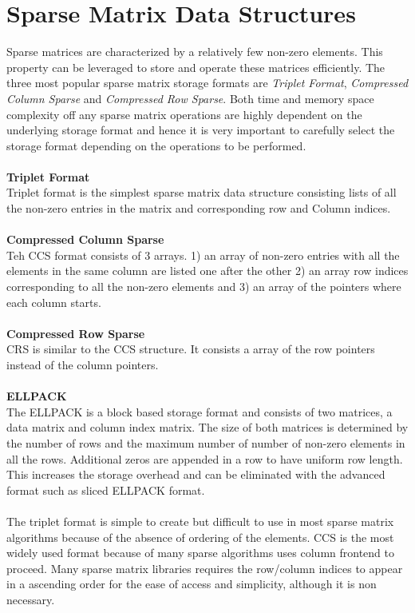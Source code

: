 \section{Sparse Matrix Data Structures}
Sparse matrices are characterized by a relatively few non-zero elements.
This property can be leveraged to store and operate these matrices efficiently. 
The three most popular sparse matrix storage formats are \textit{Triplet Format}, 
\textit{Compressed Column Sparse} and \textit{Compressed Row Sparse}.
Both time and memory space complexity off any sparse matrix operations are highly 
dependent on the underlying storage format and hence it is very important to 
carefully select the storage format depending on the operations to be performed.
\\
\\
\textbf{Triplet Format}\\
Triplet format is the simplest sparse matrix data structure consisting 
lists of all the non-zero entries in the matrix and corresponding row and Column
indices.
\\
\\
\textbf{Compressed Column Sparse}\\
Teh CCS format consists of 3 arrays. 1) an array of non-zero entries with all the 
elements in the same column are listed one after the other 2) an array row indices 
corresponding to all the non-zero elements and 3) an array of the pointers
where each column starts.
\\
\\
\textbf{Compressed Row Sparse}\\
CRS is similar to the CCS structure. It consists a array of the row pointers instead of 
the column pointers.
\\
\\
\textbf{ELLPACK}\\
The ELLPACK is a block based storage format and consists of two matrices, a data matrix
and column index matrix. The size of both matrices is determined by the number of 
rows and the maximum number of number of non-zero elements in all the rows.
Additional zeros are appended in a row to have uniform row length. This increases the storage overhead and can be
eliminated with the advanced format such as sliced ELLPACK format.
\\
\\
The triplet format is simple to create but difficult to use in most sparse matrix
algorithms because of the absence of ordering of the elements. CCS is the most 
widely used format because of many sparse algorithms uses column frontend to proceed.
Many sparse matrix libraries requires the row/column indices to appear in a ascending 
order for the ease of access and simplicity, although it is non necessary.


